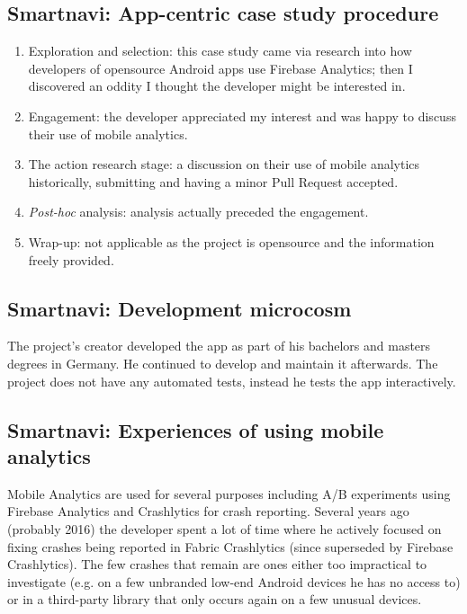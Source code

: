 \subsection{Smartnavi: App-centric case study procedure}
{\small
\begin{enumerate}
    \itemsep0em
    \item Exploration and selection: this case study came via research into how developers of opensource Android apps use Firebase Analytics; then I discovered an oddity I thought the developer might be interested in.
    \item Engagement: the developer appreciated my interest and was happy to discuss their use of mobile analytics.
    \item The action research stage:  a discussion on their use of mobile analytics historically, submitting and having a minor Pull Request accepted.
    \item \textit{Post-hoc} analysis: analysis actually preceded the engagement.
    \item Wrap-up: not applicable as the project is opensource and the information freely provided.
\end{enumerate}
}


\subsection{Smartnavi: Development microcosm}
The project's creator developed the app as part of his bachelors and masters degrees in Germany. He continued to develop and maintain it afterwards. The project does not have any automated tests, instead he tests the app interactively. %

\subsection{Smartnavi: Experiences of using mobile analytics}
Mobile Analytics are used for several purposes including A/B experiments using Firebase Analytics and Crashlytics for crash reporting. Several years ago (probably 2016) the developer spent a lot of time where he actively focused on fixing crashes being reported in Fabric Crashlytics (since superseded by Firebase Crashlytics). The few crashes that remain are ones either too impractical to investigate (e.g. on a few unbranded low-end Android devices he has no access to) or in a third-party library that only occurs again on a few unusual devices.

